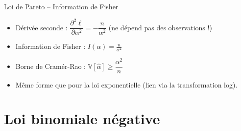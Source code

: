 \documentclass[11pt,aspectratio=169]{beamer}
\begin{document}
\begin{frame}{Loi de Pareto -- Information de Fisher}

\begin{itemize}

\item Dérivée seconde : $\dfrac{\partial^2 \ell}{\partial \alpha^2} = -\dfrac{n}{\alpha^2}$ (ne dépend pas des observations !)\newline

\item Information de Fisher : $\boxed{I(\alpha) = \frac{n}{\alpha^2}}$\newline

\item Borne de Cramér-Rao : $\mathbb{V}[\hat{\alpha}] \geq \dfrac{\alpha^2}{n}$\newline

\item Même forme que pour la loi exponentielle (lien via la transformation log).

\end{itemize}

\end{frame}

\section{Loi binomiale négative}
\end{document}
